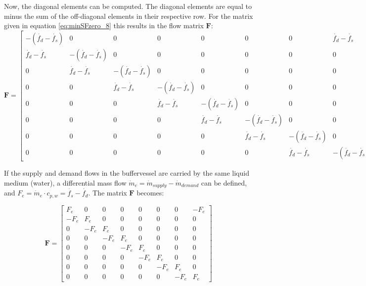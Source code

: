 \begin{scriptsize}
	Now, the diagonal elements can be computed. The diagonal elements are equal to minus the sum of the off-diagonal elements in their respective row. For the matrix given in equation \ref{eq:minSFzero_8} this results in the flow matrix $\mathbf{F}$:
	\begin{equation}
		\mathbf{F} =  
		\begin{bmatrix}
			-(\dot{f_d}-\dot{f_s}) & 0 & 0 & 0 & 0 & 0 & 0 & \dot{f_d}-\dot{f_s} \\
			\dot{f_d}-\dot{f_s} & -(\dot{f_d}-\dot{f_s}) & 0 & 0 & 0 & 0 & 0 & 0 \\
			0 & \dot{f_d}-\dot{f_s} & -(\dot{f_d}-\dot{f_s}) & 0 & 0 & 0 & 0 & 0 \\
			0 & 0 & \dot{f_d}-\dot{f_s} & -(\dot{f_d}-\dot{f_s}) & 0 & 0 & 0 & 0 \\
			0 & 0 & 0 & \dot{f_d}-\dot{f_s} & -(\dot{f_d}-\dot{f_s}) & 0 & 0 & 0 \\
			0 & 0 & 0 & 0 & \dot{f_d}-\dot{f_s} & -(\dot{f_d}-\dot{f_s}) & 0 & 0 \\
			0 & 0 & 0 & 0 & 0 & \dot{f_d}-\dot{f_s} & -(\dot{f_d}-\dot{f_s}) & 0 \\
			0 & 0 & 0 & 0 & 0 & 0 & \dot{f_d}-\dot{f_s} & -(\dot{f_d}-\dot{f_s})
		\end{bmatrix}
		\label{eq:flowmatrix}
	\end{equation}
	
	If the supply and demand flows in the buffervessel are carried by the same liquid medium (water), a differential mass flow $\dot{m}_e = \dot{m}_{supply} - \dot{m}_{demand}$ can be defined, and 
	$ F_e = \dot{m}_{e} \cdot c_{p, w} = \dot{f_s}-\dot{f_d}$. The matrix $\mathbf{F}$ becomes:
	
	\begin{equation}
		\mathbf{F} =  
		\begin{bmatrix}
			F_e & 0 & 0 & 0 & 0 & 0 & 0 & -F_e \\
			-F_e &F_e & 0 & 0 & 0 & 0 & 0 & 0 \\
			0 & -F_e & F_e & 0 & 0 & 0 & 0 & 0 \\
			0 & 0 & -F_e & F_e & 0 & 0 & 0 & 0 \\
			0 & 0 & 0 & -F_e & F_e & 0 & 0 & 0 \\
			0 & 0 & 0 & 0 & -F_e & F_e & 0 & 0 \\
			0 & 0 & 0 & 0 & 0 & -F_e & F_e & 0 \\
			0 & 0 & 0 & 0 & 0 & 0 & -F_e & F_e
		\end{bmatrix}
		\label{eq:flowmatrix}
	\end{equation}
	

\end{scriptsize}
